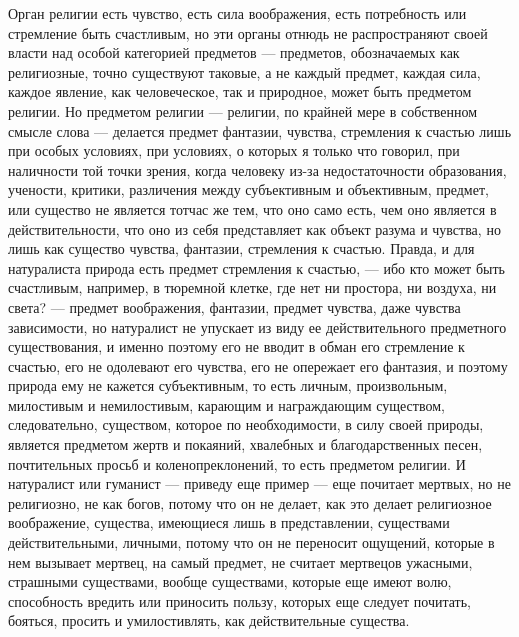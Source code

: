 \documentclass[12pt]{article}
\begin{document}
Орган религии есть чувство, есть сила воображения, есть потребность или стремление быть счастливым, но эти органы отнюдь не распространяют своей власти над особой категорией предметов --- предметов, обозначаемых как религиозные, точно существуют таковые, а не каждый предмет, каждая сила, каждое явление, как человеческое, так и природное, может быть предметом религии. Но предметом религии --- религии, по крайней мере в собственном смысле слова --- делается предмет фантазии, чувства, стремления к счастью лишь при особых условиях, при условиях, о которых я только что говорил, при наличности той точки зрения, когда человеку из-за недостаточности образования, учености, критики, различения между субъективным и объективным, предмет, или существо не является тотчас же тем, что оно само есть, чем оно является в действительности, что оно из себя представляет как объект разума и чувства, но лишь как существо чувства, фантазии, стремления к счастью. Правда, и для натуралиста природа есть предмет стремления к счастью, --- ибо кто может быть счастливым, например, в тюремной клетке, где нет ни простора, ни воздуха, ни света? --- предмет воображения, фантазии, предмет чувства, даже чувства зависимости, но натуралист не упускает из виду ее действительного предметного существования, и именно поэтому его не вводит в обман его стремление к счастью, его не одолевают его чувства, его не опережает его фантазия, и поэтому природа ему не кажется субъективным, то есть личным, произвольным, милостивым и немилостивым, карающим и награждающим существом, следовательно, существом, которое по необходимости, в силу своей природы, является предметом жертв и покаяний, хвалебных и благодарственных песен, почтительных просьб и коленопреклонений, то есть предметом религии. И натуралист или гуманист --- приведу еще пример --- еще почитает мертвых, но не религиозно, не как богов, потому что он не делает, как это делает религиозное воображение, существа, имеющиеся лишь в представлении, существами действительными, личными, потому что он не переносит ощущений, которые в нем вызывает мертвец, на самый предмет, не считает мертвецов ужасными, страшными существами, вообще существами, которые еще имеют волю, способность вредить или приносить пользу, которых еще следует почитать, бояться, просить и умилостивлять, как действительные существа. 
\end{document}
